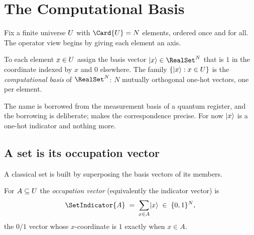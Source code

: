 %

\section{The Computational Basis}
\label{sec:operator-computational-basis}

Fix a finite universe $U$ with $\Card{\Universe} = N$ elements, ordered
once and for all. The operator view begins by giving each element an axis.

\begin{definition}
\label{def:computational-basis}
To each element $x \in U$ assign the basis vector $\ket{x} \in
\RealSet^{N}$ that is $1$ in the coordinate indexed by $x$ and $0$ elsewhere.
The family $\{\lvert x \rangle : x \in U\}$ is the \emph{computational basis} of
$\RealSet^{N}$: $N$ mutually orthogonal one-hot vectors, one per element.
\end{definition}

The name is borrowed from the measurement basis of a quantum register, and the
borrowing is deliberate;  makes the
correspondence precise. For now $\lvert x \rangle$ is a one-hot indicator and nothing
more.

\subsection*{A set is its occupation vector}

A classical set is built by superposing the basis vectors of its members.

\begin{definition}
\label{def:occupation-vector}
For $A \subseteq U$ the \emph{occupation vector} (equivalently the
indicator vector) is
\[
  \SetIndicator{A} \;=\; \sum_{x \in A} \ket{x} \;\in\; \{0,1\}^{N},
\]
the $0/1$ vector whose $x$-coordinate is $1$ exactly when $x \in A$.
\end{definition}

